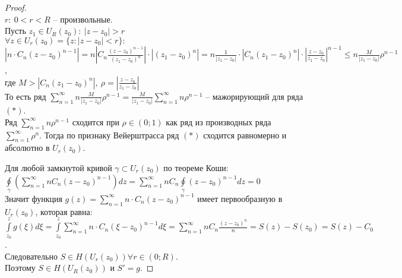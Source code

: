 \begin{proof}
    \ \\
    $r: \ 0<r<R$ -- произвольные.\\
    Пусть $z_1 \in U_R(z_0): \ |z-z_0| > r$\\
    $\forall z \in U_r(z_0) = \{z: |z-z_0|<r\}:$\\
    $|n\cdot C_n(z-z_0)^{n-1}| = n\left|C_n\frac{(z-z_0)^{n-1}}{(z_1-z_0)^n}\right|\cdot |(z_1-z_0)^n|=n\frac{1}{|z_1-z_0|}\cdot |C_n (z_1-z_0)^n|\cdot \left|\frac{z-z_0}{z_1-z_0}\right|^{n-1}\leq n\frac{M}{|z_1-z_0|}\rho^{n-1}$,\\
    где $M > |C_n (z_1-z_0)^n|, \ \rho = \left|\frac{z-z_0}{z_1-z_0}\right|$\\
    То есть ряд $\sum_{n=1}^\infty n\frac{M}{|z_1-z_0|}\rho^{n-1}=\frac{M}{|z_1-z_0|}\sum_{n=1}^\infty n\rho^{n-1}$ -- мажорирующий для ряда $(*)$.\\
    Ряд $\sum_{n=1}^\infty n\rho^{n-1}$ сходится при $\rho \in (0; 1)$ как ряд из производных ряда $\sum_{n=1}^\infty\rho^n$. Тогда по признаку Вейерштрасса ряд $(*)$ сходится равномерно и абсолютно в $U_r(z_0)$.

    Для любой замкнутой кривой $\gamma \subset U_r(z_0)$ по теореме Коши:\\
    $\oint\limits_{\gamma}\left( \sum_{n=1}^\infty n C_n (z-z_0)^{n-1} \right)dz=\sum_{n=1}^\infty n C_n \oint\limits_{\gamma}(z-z_0)^{n-1}dz=0$\\
    Значит функция $g(z)=\sum_{n=1}^\infty n\cdot C_n(z-z_0)^{n-1}$ имеет первообразную в $U_r(z_0)$, которая равна:\\
    $\int\limits_{z_0}^z g(\xi)d\xi = \int\limits_{z_0}^z\sum_{n=1}^{\infty} n\cdot C_n (\xi-z_0)^{n-1}d\xi=\sum_{n=1}^{\infty} n C_n \frac{(z-z_0)^n}{n} = S(z)-S(z_0) = S(z)-C_0$.\\
    Следовательно $S \in H(U_r(z_0)) \forall r \in (0; R)$.\\
    Поэтому $S \in H(U_R(z_0))$ и $S'=g$.
\end{proof}

